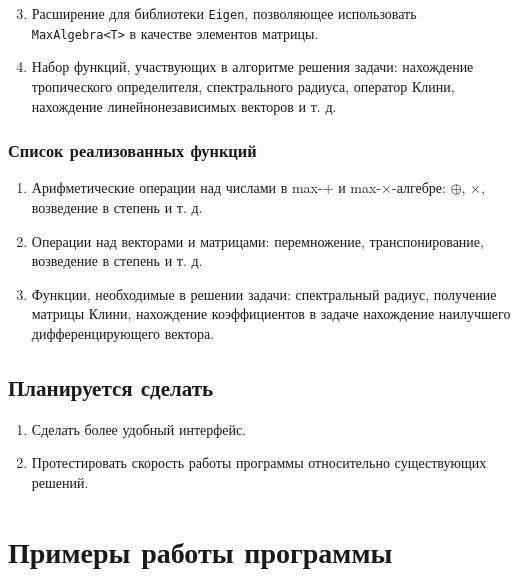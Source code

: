 \documentclass[specialist,
	substylefile = spbu_report.rtx,
	subf,href,colorlinks=true, 12pt]{disser}
\begin{document}
\begin{enumerate}
  \setcounter{enumi}{2}
		\item Расширение для библиотеки \texttt{Eigen}, позволяющее использовать \texttt{MaxAlgebra<T>} в качестве элементов матрицы.
		\item Набор функций, участвующих в алгоритме решения задачи: нахождение тропического определителя, спектрального радиуса, оператор Клини, нахождение линейнонезависимых векторов и т. д.
\end{enumerate}
\subsection{Список реализованных функций}

\begin{enumerate}
	\item Арифметические операции над числами в max-+ и max-$\times$-алгебре: $\oplus$, $\times$, возведение в степень и т. д.
	\item Операции над векторами и матрицами: перемножение, транспонирование, возведение в степень и т. д.
	\item Функции, необходимые в решении задачи: спектральный радиус, получение матрицы Клини, нахождение коэффициентов в задаче нахождение наилучшего дифференцирующего вектора.
\end{enumerate}


\conclusion
\section{Планируется сделать}
\begin{enumerate}
	\item Сделать более удобный интерфейс.
	\item Протестировать скорость работы программы относительно существующих решений.
\end{enumerate}

\printbibliography

\appendix
\cleardoublepage\makeatletter\@openrightfalse\makeatother
\chapter{Примеры работы программы}
\end{document}
